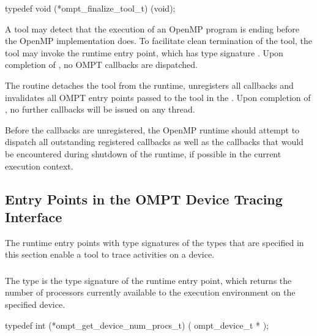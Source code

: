 \format
\begin{ccppspecific}
\begin{omptInquiry}
typedef void (*ompt_finalize_tool_t) (void);
\end{omptInquiry}
\end{ccppspecific}

\descr
A tool may detect that the execution of an OpenMP program is ending 
before the OpenMP implementation does. To facilitate clean termination 
of the tool, the tool may invoke the  runtime 
entry point, which has type signature . Upon 
completion of , no OMPT callbacks are dispatched.

\effect
The  routine detaches the tool from the runtime, 
unregisters all callbacks and invalidates all OMPT entry points passed to 
the tool in the . Upon completion of ,
no further callbacks will be issued on any thread.

Before the callbacks are unregistered, the OpenMP runtime should attempt
to dispatch all outstanding registered callbacks as well as the callbacks 
that would be encountered during shutdown of the runtime, if possible in 
the current execution context.



\subsection{Entry Points in the OMPT Device Tracing Interface}
\label{sec:ompt-tracing-entry-points}

The runtime entry points with type signatures of the types that are 
specified in this section enable a tool to trace activities on a device.



\subsubsection{}
\label{sec:ompt_get_device_num_procs_t}

\summary
The  type is the type signature of the 
 runtime entry point, which returns the 
number of processors currently available to the execution environment on 
the specified device.

\format
\begin{ccppspecific}
\begin{omptInquiry}
typedef int (*ompt_get_device_num_procs_t) (
  ompt_device_t *
);
\end{omptInquiry}
\end{ccppspecific}


